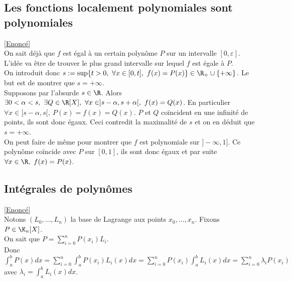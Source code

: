 \documentclass{book}
\begin{document}
	\subsection{Les fonctions localement polynomiales sont polynomiales }
	\label{sec:les-fonctions-localement-polynomiale-sont-polynomiales}
	\textcolor{blue}{\hyperref[Les fonctions localement polynomiales sont polynomiales]{[Enoncé]}}\\
	On sait déjà que $f$ est égal à un certain polynôme $P$ sur un intervalle $[0,\varepsilon]$. L'idée va être de trouver le plus grand intervalle sur lequel $f$ est égale à $P$.\\
	On introduit donc $s:=\sup\{t>0,\ \forall x\in [0,t],\ f(x)=P(x)\}\in \R_+\cup\{+\infty\}$. Le but est de montrer que $s=+\infty$.\\
	Supposons par l'absurde $s\in \R$. Alors $\exists 0<\alpha<s,\ \exists Q\in \R[X],\ \forall x\in ]s-\alpha,s+\alpha[,\ f(x)=Q(x)$. En particulier $\forall x\in [s-\alpha,s[,\ P(x)=f(x)=Q(x)$. $P$ et $Q$ coïncident en une infinité de points, ils sont donc égaux. Ceci contredit la maximalité de $s$ et on en déduit que $s=+\infty$.\\
	On peut faire de même pour montrer que $f$ est polynomiale sur $]-\infty,1]$. Ce polynôme coïncide avec $P$ sur $[0,1]$, ils sont donc égaux et par suite $\forall x\in \R,\ f(x)=P(x)$.
	
	\subsection{Intégrales de polynômes }
	\label{sec:integrales-de-polynomes-etoile1}
	\textcolor{blue}{\hyperref[Intégrales de polynômes]{[Enoncé]}}\\
	Notons $(L_0,\dots,L_n)$ la base de Lagrange aux points $x_0,\dots,x_n$. Fixons $P\in \K_n[X]$.\\
	On sait que $P=\displaystyle\sum_{i=0}^nP(x_i)L_i$.\\
	Donc $\displaystyle\int_a^bP(x)dx=\sum_{i=0}^n\int_a^bP(x_i)L_i(x)dx=\sum_{i=0}^nP(x_i)\int_a^bL_i(x)dx=\sum_{i=0}^n\lambda_iP(x_i)$ avec $\lambda_i=\displaystyle\int_a^bL_i(x)dx$.
	
\end{document}

